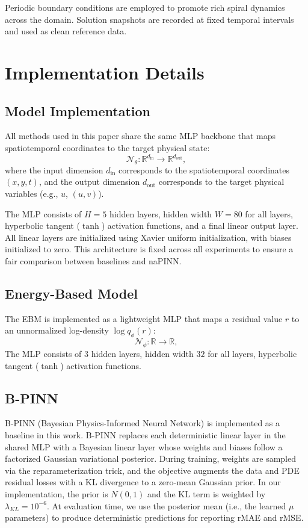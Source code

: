 \documentclass{article}
\theoremstyle{plain}
\theoremstyle{definition}
\theoremstyle{remark}
\begin{document}
Periodic boundary conditions are employed to promote rich spiral dynamics across the domain. Solution snapshots are recorded at fixed temporal intervals and used as clean reference data.

\section{Implementation Details}
\label{appendix:ImplementationDetails}

\subsection{Model Implementation}
All methods used in this paper share the same MLP backbone that maps spatiotemporal coordinates to the target physical state:
\begin{equation}
    \mathcal{N}_\theta: \mathbb{R}^{d_\mathrm{in}} \rightarrow \mathbb{R}^{d_\mathrm{out}},
\end{equation}
where the input dimension $d_\mathrm{in}$ corresponds to the spatiotemporal coordinates $(x,y,t)$, and the output dimension $d_\mathrm{out}$ corresponds to the target physical variables (e.g., $u$, $(u, v)$).

The MLP consists of $H=5$ hidden layers, hidden width $W=80$ for all layers, hyperbolic tangent ($\tanh$) activation functions, and a final linear output layer. All linear layers are initialized using Xavier uniform initialization, with biases initialized to zero. This architecture is fixed across all experiments to ensure a fair comparison between baselines and naPINN.

\subsection{Energy-Based Model}
The EBM is implemented as a lightweight MLP that maps a residual value $r$ to an unnormalized log-density $\log q_\phi (r)$:
\begin{equation}
    \mathcal{N}_\phi: \mathbb{R} \rightarrow \mathbb{R},
\end{equation}
The MLP consists of $3$ hidden layers, hidden width $32$ for all layers, hyperbolic tangent ($\tanh$) activation functions.

\subsection{B-PINN}
B-PINN (Bayesian Physics-Informed Neural Network) is implemented as a baseline in this work. B-PINN replaces each deterministic linear layer in the shared MLP with a Bayesian linear layer whose weights and biases follow a factorized Gaussian variational posterior. During training, weights are sampled via the reparameterization trick, and the objective augments the data and PDE residual losses with a KL divergence to a zero-mean Gaussian prior. In our implementation, the prior is $N(0,1)$ and the KL term is weighted by $\lambda_{KL} = 10^{-6}$. At evaluation time, we use the posterior mean (i.e., the learned $\mu$ parameters) to produce deterministic predictions for reporting rMAE and rMSE.
\end{document}
